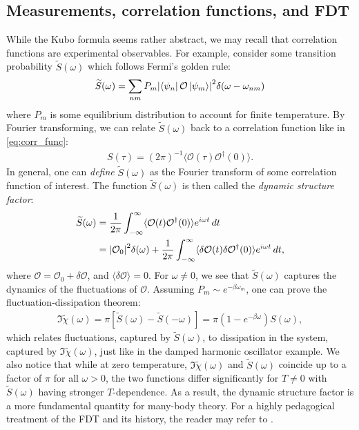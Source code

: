 \documentclass[prl,
twocolumn,
nofootinbib,
amsmath,amssymb,
aps]{revtex4-1}
\newcommand{\be}{\beta}
\newcommand{\f}[2]{\frac{#1}{#2}}
\begin{document}
\subsection{Measurements, correlation functions, and FDT}
While the Kubo formula seems rather abstract, we may recall that correlation functions are experimental observables. For example, consider some transition probability $\widetilde{S}(\omega)$ which follows Fermi's golden rule:
\begin{align*}
\widetilde{S}(\omega) = \sum_{nm} P_m \abs{ \bra{\psi_n} \mathcal{O} \ket{\psi_m}  }^2  \delta(\omega - \omega_{nm}) 
\end{align*}
where $P_m$ is some equilibrium distribution to account for finite temperature. By Fourier transforming, we can relate $\widetilde{S}(\omega)$ back to a correlation function like in \eqref{eq:corr_func}:
\begin{align*}
S(\tau) = (2\pi)^{-1}\langle \mathcal{O}(\tau) \mathcal{O}^\dagger(0) \rangle. 
\end{align*}
In general, one can \textit{define} $\widetilde{S}(\omega)$ as the Fourier transform of some correlation function of interest. The function $\widetilde{S}(\omega)$ is then called the \textit{dynamic structure factor}:
\begin{align*}
\widetilde{S}(\omega) 
&= \f{1}{2\pi}\int_{-\infty}^\infty \langle \mathcal{O}(t) \mathcal{O}^\dagger (0) \rangle e^{i \omega t }\,dt\\
&= \abs{\mathcal{O}_0}^2 \delta(\omega) + \f{1}{2\pi} \int_{-\infty}^\infty \langle \delta \mathcal{O}(t) \delta \mathcal{O}^\dagger (0) \rangle e^{i\omega t }\,dt,
\end{align*}
where $ \mathcal{O} = \mathcal{O}_0 + \delta \mathcal{O}$, and $\langle \delta \mathcal{O} \rangle = 0$. For $ \omega \neq 0$, we see that $\widetilde{S}(\omega)$ captures the dynamics of the fluctuations of $\mathcal{O}$. Assuming $P_m \sim e^{-\be \omega_m}$, one can prove the fluctuation-dissipation theorem:
\begin{align*}
\Im \widetilde{\chi}(\omega) = \pi[\widetilde{S}(\omega) - \widetilde{S}(-\omega)] = \pi (1 - e^{-\be \omega}) S(\omega),
\end{align*}
which relates fluctuations, captured by $\widetilde{S}(\omega)$, to dissipation in the system, captured by $\Im\widetilde{\chi}(\omega)$, just like in the damped harmonic oscillator example. We also notice that while at zero temperature, $\Im \widetilde{\chi}(\omega)$ and $\widetilde{S}(\omega)$ coincide up to a factor of $\pi$ for all $\omega >0$, the two functions differ significantly for $T \neq 0$ with $\widetilde{S}(\omega)$ having stronger $T$-dependence. As a result, the dynamic structure factor is a more fundamental quantity for many-body theory. For a highly pedagogical treatment of the FDT and its history, the reader may refer to \cite{marconi2008fluctuation}.
\end{document}
